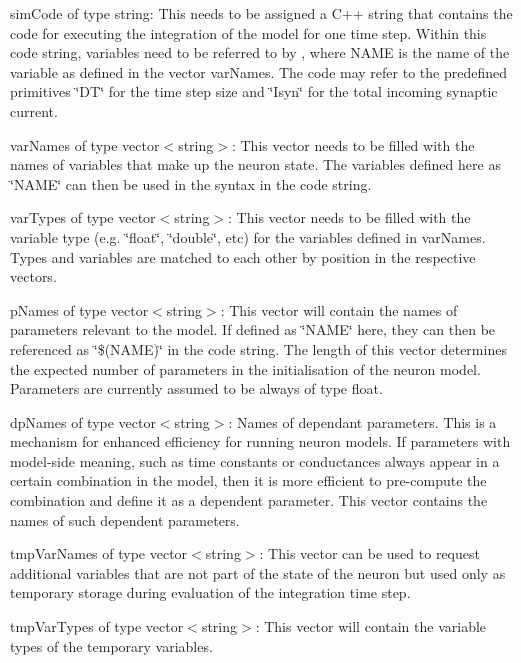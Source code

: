 \begin{DoxyItemize}
\item {\ttfamily sim\+Code} of type {\ttfamily string\+:} This needs to be assigned a C++ string that contains the code for executing the integration of the model for one time step. Within this code string, variables need to be referred to by , where N\+A\+M\+E is the name of the variable as defined in the vector var\+Names. The code may refer to the predefined primitives \char`\"{}\+D\+T\char`\"{} for the time step size and \char`\"{}\+Isyn\char`\"{} for the total incoming synaptic current.
\item {\ttfamily var\+Names} of type {\ttfamily vector$<$string$>$}\+: This vector needs to be filled with the names of variables that make up the neuron state. The variables defined here as \char`\"{}\+N\+A\+M\+E\char`\"{} can then be used in the syntax  in the code string.
\item {\ttfamily var\+Types} of type {\ttfamily vector$<$string$>$}\+: This vector needs to be filled with the variable type (e.\+g. \char`\"{}float\char`\"{}, \char`\"{}double\char`\"{}, etc) for the variables defined in {\ttfamily var\+Names}. Types and variables are matched to each other by position in the respective vectors.
\item {\ttfamily p\+Names} of type {\ttfamily vector$<$string$>$}\+: This vector will contain the names of parameters relevant to the model. If defined as \char`\"{}\+N\+A\+M\+E\char`\"{} here, they can then be referenced as \char`\"{}\$(\+N\+A\+M\+E)\char`\"{} in the code string. The length of this vector determines the expected number of parameters in the initialisation of the neuron model. Parameters are currently assumed to be always of type float.
\item {\ttfamily dp\+Names} of type {\ttfamily vector$<$string$>$}\+: Names of dependant parameters. This is a mechanism for enhanced efficiency for running neuron models. If parameters with model-\/side meaning, such as time constants or conductances always appear in a certain combination in the model, then it is more efficient to pre-\/compute the combination and define it as a dependent parameter. This vector contains the names of such dependent parameters.
\item {\ttfamily tmp\+Var\+Names} of type {\ttfamily vector$<$string$>$}\+: This vector can be used to request additional variables that are not part of the state of the neuron but used only as temporary storage during evaluation of the integration time step.
\item {\ttfamily tmp\+Var\+Types} of type {\ttfamily vector$<$string$>$}\+: This vector will contain the variable types of the temporary variables.
\end{DoxyItemize}

